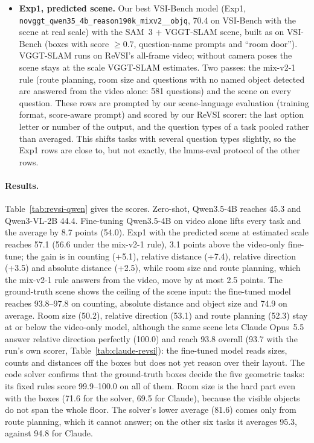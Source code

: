 \begin{itemize}
label, the longest box side, the closest points between boxes, left/right/back from the box centres, the smallest
rectangle around all boxes for room size). Route planning has no rule and is scored 0. Both are scored by the
first word of the answer with the question types of a task averaged, as the zero-shot rows.
\item \textbf{Exp1, predicted scene.} Our best VSI-Bench model (Exp1, \texttt{novggt\_\allowbreak qwen35\_\allowbreak 4b\_\allowbreak reason190k\_\allowbreak mixv2\_\_\allowbreak objq},
70.4 on VSI-Bench with the scene at real scale) with the SAM~3 + VGGT-SLAM scene, built as on VSI-Bench (boxes with
score $\ge 0.7$, question-name prompts and ``room door''). VGGT-SLAM runs on ReVSI's all-frame video; without
camera poses the scene stays at the scale VGGT-SLAM estimates. Two passes: the mix-v2-1 rule (route planning,
room size and questions with no named object detected are answered from the video alone: 581 questions) and the
scene on every question. These rows are prompted by our scene-language evaluation (training format, score-aware
prompt) and scored by our ReVSI scorer: the last option letter or number of the output, and the question types of
a task pooled rather than averaged. This shifts tasks with several question types slightly, so the Exp1 rows are
close to, but not exactly, the lmms-eval protocol of the other rows.
\end{itemize}

\paragraph{Results.}
Table~\ref{tab:revsi-qwen} gives the scores. Zero-shot, Qwen3.5-4B reaches 45.3 and Qwen3-VL-2B 44.4.
Fine-tuning Qwen3.5-4B on video alone lifts every task and the average by 8.7 points (54.0). Exp1 with the predicted
scene at estimated scale reaches 57.1 (56.6 under the mix-v2-1 rule), 3.1 points above the video-only fine-tune;
the gain is in counting (+5.1), relative distance (+7.4), relative direction (+3.5) and absolute distance (+2.5),
while room size and route planning, which the mix-v2-1 rule answers from the video, move by at most 2.5 points.
The ground-truth scene shows the ceiling of the scene input: the fine-tuned model reaches 93.8--97.8 on counting,
absolute distance and object size and 74.9 on average. Room size (50.2), relative direction (53.1) and route
planning (52.3) stay at or below the video-only model, although the same scene lets Claude Opus~5.5 answer relative
direction perfectly (100.0) and reach 93.8 overall (93.7 with the run's own scorer, Table~\ref{tab:claude-revsi}): the fine-tuned model reads
sizes, counts and distances off the boxes but does not yet reason over their layout.
The code solver confirms that the ground-truth boxes decide the five geometric tasks: its fixed rules score
99.9--100.0 on all of them. Room size is the hard part even with the boxes (71.6 for the solver, 69.5 for Claude),
because the visible objects do not span the whole floor. The solver's lower average (81.6) comes only from route
planning, which it cannot answer; on the other six tasks it averages 95.3, against 94.8 for Claude.

